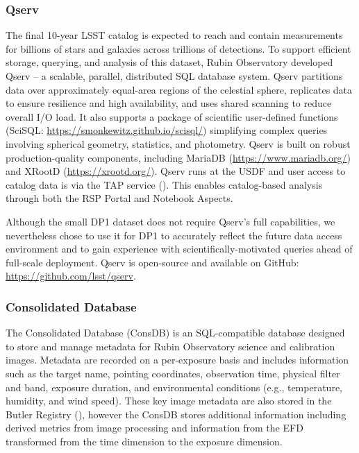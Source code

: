 \subsubsection{Qserv}
\label{sssec:qserv}
The final 10-year \gls{LSST} catalog is expected to reach \tenyearcatalogsize and contain measurements for billions of stars and galaxies across trillions of detections.
To support efficient storage, querying, and analysis of this dataset,  Rubin Observatory developed Qserv \citep{Wang:2011:QDS:2063348.2063364, C15_adassxxxii} -- a scalable, parallel, distributed SQL database system.
\gls{Qserv} partitions data over approximately equal-area regions of the celestial sphere, replicates data to ensure resilience and high availability, and uses shared scanning to reduce overall I/O load.
It also supports a package of scientific user-defined functions (SciSQL: \url{https://smonkewitz.github.io/scisql/}) simplifying complex queries involving spherical geometry, statistics, and photometry.
\gls{Qserv} is built on robust production-quality components, including MariaDB (\url{https://www.mariadb.org/}) and XRootD (\url{https://xrootd.org/}).
Qserv runs at the \gls{USDF} and user access to catalog data is via the TAP service ().
This enables catalog-based analysis through both the \gls{RSP} Portal and Notebook Aspects.

Although the small \gls{DP1} dataset does not require Qserv’s full capabilities, we nevertheless chose to use it for \gls{DP1} to accurately reflect the future data access environment and to gain experience with scientifically-motivated queries ahead of full-scale deployment.
\gls{Qserv} is open-source and available on GitHub: \url{https://github.com/lsst/qserv}.

\subsubsection{Consolidated Database}
\label{sssec:consdb}

The Consolidated Database (ConsDB) \citep{DMTN-227} is an SQL-compatible database designed to store and manage metadata for Rubin Observatory science and calibration images.
Metadata are recorded on a per-exposure basis and includes information such as the target name, pointing coordinates, observation time, physical filter and band, exposure duration, and environmental conditions (e.g., temperature, humidity, and wind speed).
These key image metadata are also stored in the Butler Registry (), however the ConsDB stores additional information  including derived metrics from image processing and information from the \gls{EFD} transformed from the time dimension to the exposure dimension.

